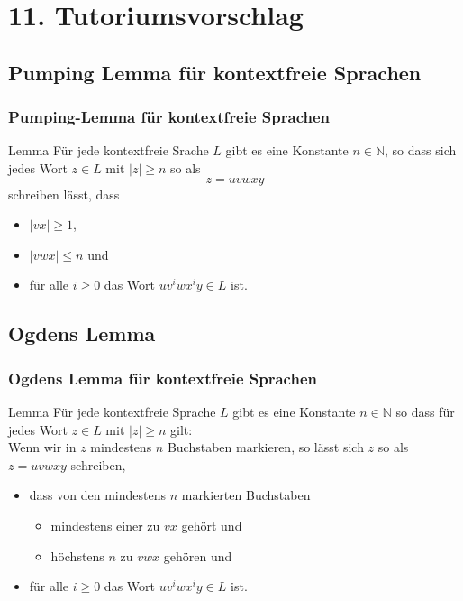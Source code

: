 \documentclass{beamer}
\begin{document}
{\section{11. Tutoriumsvorschlag}
\subsection{Pumping Lemma für kontextfreie Sprachen}
\begin{frame}
\frametitle{Pumping-Lemma für kontextfreie Sprachen}
\begin{exampleblock}{Lemma}
Für jede kontextfreie Srache $L$ gibt es eine Konstante $n \in \mathbb{N}$,
so dass sich jedes Wort $z \in L$ mit $|z| \geq n$ so als
$$ z = uvwxy $$
schreiben lässt, dass
\begin{itemize}
\item $|vx| \geq 1$,
\item $|vwx| \leq n$ und
\item für alle $i \geq 0$ das Wort $uv^iwx^iy \in L$ ist.
\end{itemize}
\end{exampleblock}
\end{frame}

\subsection{Ogdens Lemma}
\begin{frame}
\frametitle{Ogdens Lemma für kontextfreie Sprachen}
\begin{exampleblock}{Lemma}
Für jede kontextfreie Sprache $L$
gibt es eine Konstante $n \in \mathbb{N}$ so dass für jedes Wort $z \in L$ mit $|z| \geq n$ gilt:\\
Wenn wir in $z$ mindestens $n$ Buchstaben markieren, so lässt sich $z$ so als $z = uvwxy$ schreiben,
\begin{itemize}
\item dass von den mindestens $n$ markierten Buchstaben
\begin{itemize}
\item mindestens einer zu $vx$ gehört und
\item höchstens $n$ zu $vwx$ gehören und
\end{itemize}
\item für alle $i \geq 0$ das Wort $uv^iwx^iy \in L$ ist.
\end{itemize}
\end{exampleblock}
\end{frame}

}
\end{document}
